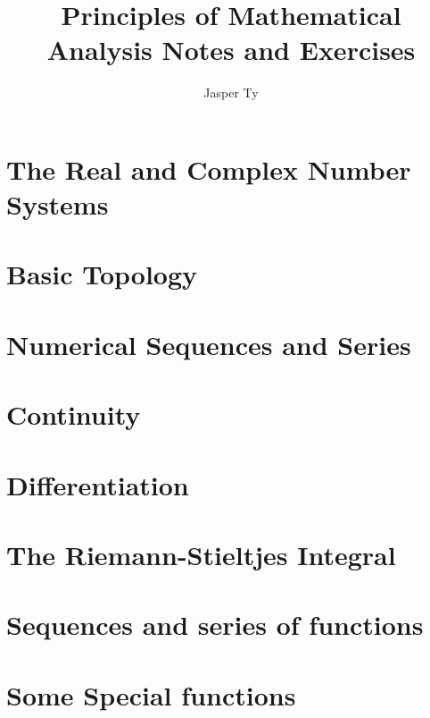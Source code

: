 \documentclass{article}
\begin{document}
\title{Principles of Mathematical Analysis Notes and Exercises}
\author{Jasper Ty}
\date{}
\maketitle

\tableofcontents
\section{The Real and Complex Number Systems}
\section{Basic Topology}
\section{Numerical Sequences and Series}
\section{Continuity}
\section{Differentiation}
\section{The Riemann-Stieltjes Integral}
\section{Sequences and series of functions}

\section{Some Special functions}
\end{document}
